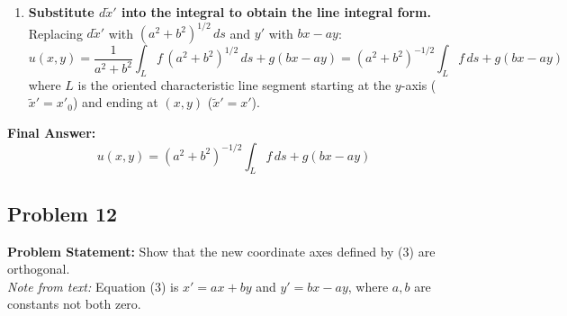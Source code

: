 \documentclass[11pt]{article}
\begin{document}
\begin{enumerate}[label=\textbf{Step \arabic*:}]
    \item \textbf{Substitute $d\tilde{x}'$ into the integral to obtain the line integral form.} \\
    Replacing $d\tilde{x}'$ with $(a^2 + b^2)^{1/2}\,ds$ and $y'$ with $bx - ay$:
    \[
    u(x, y) = \frac{1}{a^2 + b^2}\int_L f\,(a^2 + b^2)^{1/2}\,ds + g(bx - ay) = (a^2 + b^2)^{-1/2}\int_L f\,ds + g(bx - ay)
    \]
    where $L$ is the oriented characteristic line segment starting at the $y$-axis ($\tilde{x}' = x'_0$) and ending at $(x, y)$ ($\tilde{x}' = x'$).
\end{enumerate}

\noindent\textbf{Final Answer:}
\[
\boxed{u(x, y) = (a^2 + b^2)^{-1/2} \int_L f\,ds + g(bx - ay)}
\]

\hrulefill

\subsection*{Problem 12}
\textbf{Problem Statement:} Show that the new coordinate axes defined by (3) are orthogonal. \\
\emph{Note from text:} Equation (3) is $x' = ax + by$ and $y' = bx - ay$, where $a, b$ are constants not both zero.
\end{document}
